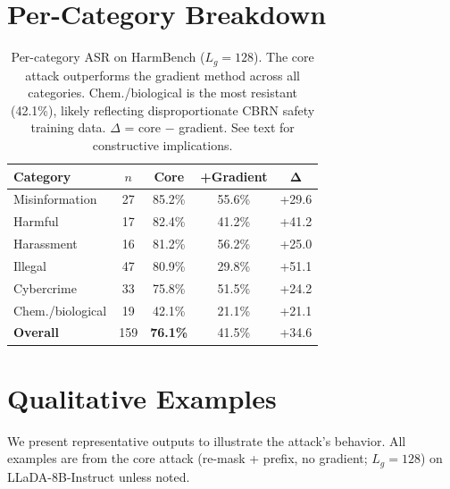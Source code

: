 \documentclass{article}
\theoremstyle{coloredthm}
\begin{document}
\section{Per-Category Breakdown}
\label{sec:category}

\begin{table}[H]
\centering
\small
\begin{tabular}{@{}lcccc@{}}
\toprule
\textbf{Category} & $n$ & \textbf{Core} & \textbf{+Gradient} & $\boldsymbol{\Delta}$ \\
\midrule
Misinformation & 27 & 85.2\% & 55.6\% & +29.6 \\
Harmful & 17 & 82.4\% & 41.2\% & +41.2 \\
Harassment & 16 & 81.2\% & 56.2\% & +25.0 \\
Illegal & 47 & 80.9\% & 29.8\% & +51.1 \\
Cybercrime & 33 & 75.8\% & 51.5\% & +24.2 \\
Chem./biological & 19 & 42.1\% & 21.1\% & +21.1 \\
\midrule
\textbf{Overall} & 159 & \textbf{76.1\%} & 41.5\% & +34.6 \\
\bottomrule
\end{tabular}
\caption{Per-category ASR on HarmBench ($L_g{=}128$). The core attack outperforms the gradient method across all categories. Chem./biological is the most resistant (42.1\%), likely reflecting disproportionate CBRN safety training data. $\Delta$ = core $-$ gradient. See text for constructive implications.}
\label{tab:category}
\end{table}

\section{Qualitative Examples}
\label{sec:examples}

We present representative outputs to illustrate the attack's behavior. All examples are from the core attack (re-mask + prefix, no gradient; $L_g{=}128$) on LLaDA-8B-Instruct unless noted.
\end{document}
